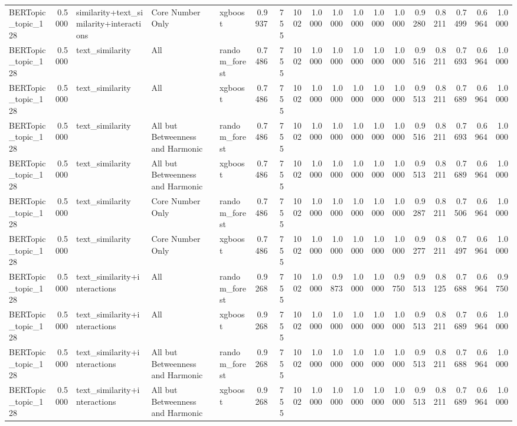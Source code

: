 \begin{tabular}{lrlllrrrrrrrrrrrrr}
BERTopic_topic_128 & 0.5000 & similarity+text_similarity+interactions & Core Number Only & xgboost & 0.9937 & 755 & 1002 & 1.0000 & 1.0000 & 1.0000 & 1.0000 & 1.0000 & 0.9280 & 0.8211 & 0.7499 & 0.6964 & 1.0000 \\
BERTopic_topic_128 & 0.5000 & text_similarity & All & random_forest & 0.7486 & 755 & 1002 & 1.0000 & 1.0000 & 1.0000 & 1.0000 & 1.0000 & 0.9516 & 0.8211 & 0.7693 & 0.6964 & 1.0000 \\
BERTopic_topic_128 & 0.5000 & text_similarity & All & xgboost & 0.7486 & 755 & 1002 & 1.0000 & 1.0000 & 1.0000 & 1.0000 & 1.0000 & 0.9513 & 0.8211 & 0.7689 & 0.6964 & 1.0000 \\
BERTopic_topic_128 & 0.5000 & text_similarity & All but Betweenness and Harmonic & random_forest & 0.7486 & 755 & 1002 & 1.0000 & 1.0000 & 1.0000 & 1.0000 & 1.0000 & 0.9516 & 0.8211 & 0.7693 & 0.6964 & 1.0000 \\
BERTopic_topic_128 & 0.5000 & text_similarity & All but Betweenness and Harmonic & xgboost & 0.7486 & 755 & 1002 & 1.0000 & 1.0000 & 1.0000 & 1.0000 & 1.0000 & 0.9513 & 0.8211 & 0.7689 & 0.6964 & 1.0000 \\
BERTopic_topic_128 & 0.5000 & text_similarity & Core Number Only & random_forest & 0.7486 & 755 & 1002 & 1.0000 & 1.0000 & 1.0000 & 1.0000 & 1.0000 & 0.9287 & 0.8211 & 0.7506 & 0.6964 & 1.0000 \\
BERTopic_topic_128 & 0.5000 & text_similarity & Core Number Only & xgboost & 0.7486 & 755 & 1002 & 1.0000 & 1.0000 & 1.0000 & 1.0000 & 1.0000 & 0.9277 & 0.8211 & 0.7497 & 0.6964 & 1.0000 \\
BERTopic_topic_128 & 0.5000 & text_similarity+interactions & All & random_forest & 0.9268 & 755 & 1002 & 1.0000 & 0.9873 & 1.0000 & 1.0000 & 0.9750 & 0.9513 & 0.8125 & 0.7688 & 0.6964 & 0.9750 \\
BERTopic_topic_128 & 0.5000 & text_similarity+interactions & All & xgboost & 0.9268 & 755 & 1002 & 1.0000 & 1.0000 & 1.0000 & 1.0000 & 1.0000 & 0.9513 & 0.8211 & 0.7689 & 0.6964 & 1.0000 \\
BERTopic_topic_128 & 0.5000 & text_similarity+interactions & All but Betweenness and Harmonic & random_forest & 0.9268 & 755 & 1002 & 1.0000 & 1.0000 & 1.0000 & 1.0000 & 1.0000 & 0.9513 & 0.8211 & 0.7688 & 0.6964 & 1.0000 \\
BERTopic_topic_128 & 0.5000 & text_similarity+interactions & All but Betweenness and Harmonic & xgboost & 0.9268 & 755 & 1002 & 1.0000 & 1.0000 & 1.0000 & 1.0000 & 1.0000 & 0.9513 & 0.8211 & 0.7689 & 0.6964 & 1.0000 \\

\end{tabular}
